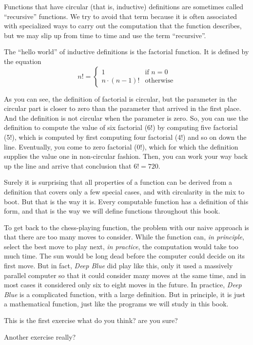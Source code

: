 Functions that have circular (that is, inductive) definitions are sometimes
called ``recursive'' functions. We try to avoid that term because it is
often associated with specialized ways to carry out the computation
that the function describes, but we may slip up from time to time and use the term ``recursive''.

The ``hello world'' of inductive definitions is the factorial function.
It is defined by the equation
\begin{displaymath}
n! =
\left\{
        \begin{array}{ll}
                1              & \mbox{if } n = 0 \\
                n \cdot (n-1)! & \mbox{otherwise}
        \end{array}
\right.
\end{displaymath}

As you can see, the definition of factorial is circular, but the parameter
in the circular part is closer to zero than the parameter that arrived in the
first place. And the definition is not circular when the parameter is zero.
So, you can use the definition to compute the value of six factorial (6!) by computing five factorial (5!), which is computed by first computing four factorial
(4!) and so on down the line. Eventually, you come to zero factorial (0!), which for which the definition supplies the value one in non-circular fashion.
Then, you can work your way back up the line and arrive that conclusion that $6! = 720$. 

Surely it is surprising that all properties of a function can be
derived from a definition that covers only a few special cases, and
with circularity in the mix to boot. But that is the way it is.
Every computable function has a definition of this form, and
that is the way we will define functions throughout this book.

To get back to the chess-playing function, the problem with our
naive approach is that there are
too many moves to consider.  While the function can, \emph{in principle},
select the best move to play next, \emph{in practice}, the computation
would take too much time. The sun would be long dead before the computer could decide on its first move.  But in fact, \textit{Deep Blue}
did play like this, only it used a massively parallel computer so that
it could consider many moves at the same time, and in most cases it
considered only six to eight moves in the future.  In practice,
\textit{Deep Blue} is a complicated function, with a large
definition.  But in principle, it is just a mathematical function,
just like the programs we will study in this book.

\begin{ExerciseList}
\Exercise This is the first exercise
        \Question what do you think?
        \Question are you sure?

\Exercise Another exercise
        \Question really?
\end{ExerciseList}

